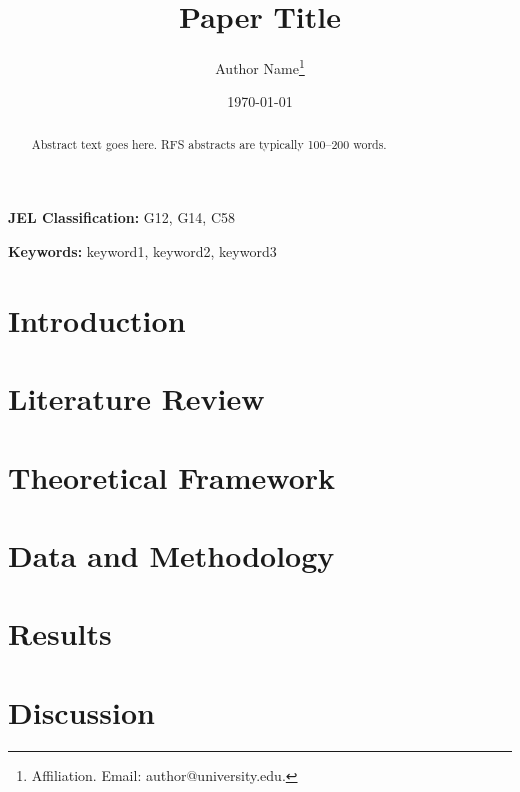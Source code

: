 \documentclass[12pt]{article}
\title{Paper Title}
\author{Author Name\thanks{Affiliation. Email: author@university.edu.}}
\date{\today}
\begin{document}
\maketitle

\begin{abstract}
\noindent
Abstract text goes here. RFS abstracts are typically 100--200 words.
\end{abstract}

\textbf{JEL Classification:} G12, G14, C58

\textbf{Keywords:} keyword1, keyword2, keyword3

\newpage

\section{Introduction}
\label{sec:intro}



\section{Literature Review}
\label{sec:literature}



\section{Theoretical Framework}
\label{sec:theory}



\section{Data and Methodology}
\label{sec:data}



\section{Results}
\label{sec:results}



\section{Discussion}
\label{sec:discussion}
\end{document}
